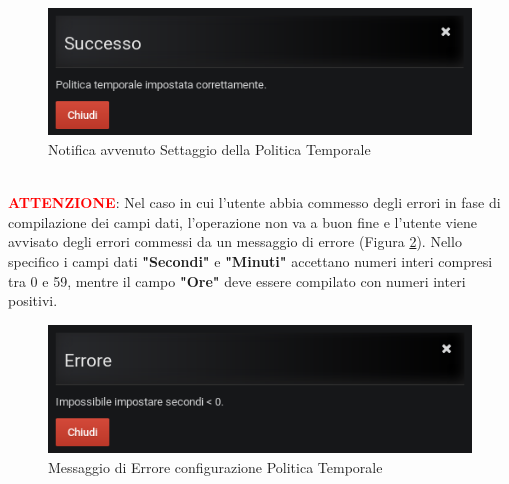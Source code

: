 \begin{figure}[H]
	\begin{center}
		\includegraphics[scale=0.6]{./images/NotificaPolicy.png}
		 \caption{Notifica avvenuto Settaggio della Politica Temporale}	
		 \label{NotificaPolicy}
	\end{center}
\end{figure}

~\\
\textbf{\textcolor{red}{ATTENZIONE}}: Nel caso in cui l'utente abbia commesso degli errori in fase di compilazione dei campi dati, l'operazione non va a buon fine e l'utente viene avvisato degli errori commessi da un messaggio di errore (Figura \ref{ErrorePolicy}). Nello specifico i campi dati \textbf{"Secondi"} e \textbf{"Minuti"} accettano numeri interi compresi tra 0 e 59, mentre il campo \textbf{"Ore"} deve essere compilato con numeri interi positivi.

\begin{figure}[H]
	\begin{center}
		\includegraphics[scale=0.6]{./images/ErrorePolicy.png}
		 \caption{Messaggio di Errore configurazione Politica Temporale}	
		 \label{ErrorePolicy}
	\end{center}
\end{figure}

